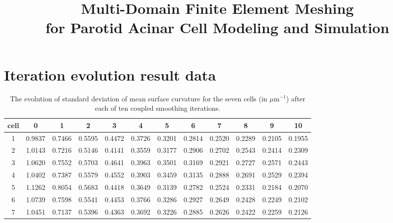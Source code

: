 \documentclass[10pt,letterpaper]{article}
\title{Multi-Domain Finite Element Meshing\\for Parotid Acinar Cell Modeling and Simulation}
\date{}
\begin{document}
\maketitle
\thispagestyle{empty}

\section*{Iteration evolution result data}

\flushleft
\begin{table}[h!]
\footnotesize
\begin{tabular}{|c|ccccccccccc|}
\hline
cell & 0 &1 &2 &3 &4 &5 &6 &7 &8 &9 &10\\
\hline

1 &0.9837 &0.7466 &0.5595 &0.4472 &0.3726 &0.3201 &0.2814 &0.2520 &0.2289 &0.2105 &0.1955\\
2 &1.0143 &0.7216 &0.5146 &0.4141 &0.3559 &0.3177 &0.2906 &0.2702 &0.2543 &0.2414 &0.2309\\
3 &1.0620 &0.7552 &0.5703 &0.4641 &0.3963 &0.3501 &0.3169 &0.2921 &0.2727 &0.2571 &0.2443\\
4 &1.0402 &0.7387 &0.5579 &0.4552 &0.3903 &0.3459 &0.3135 &0.2888 &0.2691 &0.2529 &0.2394\\
5 &1.1262 &0.8054 &0.5683 &0.4418 &0.3649 &0.3139 &0.2782 &0.2524 &0.2331 &0.2184 &0.2070\\
6 &1.0739 &0.7598 &0.5541 &0.4453 &0.3766 &0.3286 &0.2927 &0.2649 &0.2428 &0.2249 &0.2102\\
7 &1.0451 &0.7137 &0.5396 &0.4363 &0.3692 &0.3226 &0.2885 &0.2626 &0.2422 &0.2259 &0.2126\\
\hline
\end{tabular}
\caption{The evolution of standard deviation of mean surface curvature for the seven cells (in $\mu \text{m}^{-1}$)  after each of ten coupled smoothing iterations.}
\end{table}
\end{document}
